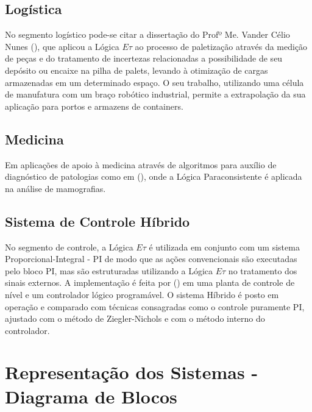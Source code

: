 \subsection{Logística}

No segmento logístico pode-se citar a dissertação do Profº Me. Vander Célio Nunes (\cite{Vander}), que aplicou a Lógica $E\tau$ ao processo de paletização através da medição de peças e do tratamento de incertezas relacionadas a possibilidade de seu depósito ou encaixe na pilha de palets, levando à otimização de cargas armazenadas em um determinado espaço. 
O seu trabalho, utilizando uma célula de manufatura com um braço robótico industrial, permite a extrapolação da sua aplicação para portos e armazens de containers.



\subsection{Medicina}

Em aplicações de apoio à medicina através de algoritmos para auxílio de diagnóstico de patologias como em \citeauthor{MauricioCM}(\citeyear{MauricioCM}), onde a Lógica Paraconsistente é aplicada na análise de mamografias.



\subsection{Sistema de Controle Híbrido}

No segmento de controle, a Lógica $E\tau$ é utilizada em conjunto com um sistema Proporcional-Integral - PI de modo que as ações convencionais são executadas pelo bloco PI, mas são estruturadas utilizando a Lógica $E\tau$ no tratamento dos sinais externos. 
A implementação é feita por \citeauthor{Marcelo}(\citeyear{Marcelo}) em uma planta de controle de nível e um controlador lógico programável. 
O sistema Híbrido é posto em operação e comparado com técnicas consagradas como o controle puramente PI, ajustado com o método de Ziegler-Nichols e com o método interno do controlador. 






\section{Representação dos Sistemas - Diagrama de Blocos}



